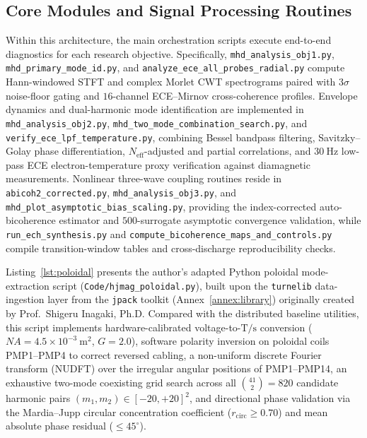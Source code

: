 \subsection{Core Modules and Signal Processing Routines}
\begin{sloppypar}
Within this architecture, the main orchestration scripts execute end-to-end diagnostics for each research objective. Specifically, \texttt{mhd\_\allowbreak analysis\_\allowbreak obj1.py}, \texttt{mhd\_\allowbreak primary\_\allowbreak mode\_\allowbreak id.py}, and \texttt{analyze\_\allowbreak ece\_\allowbreak all\_\allowbreak probes\_\allowbreak radial.py} compute Hann-windowed STFT and complex Morlet CWT spectrograms paired with $3\sigma$ noise-floor gating and $16$-channel ECE--Mirnov cross-coherence profiles. Envelope dynamics and dual-harmonic mode identification are implemented in \texttt{mhd\_\allowbreak analysis\_\allowbreak obj2.py}, \texttt{mhd\_\allowbreak two\_\allowbreak mode\_\allowbreak combination\_\allowbreak search.py}, and \texttt{verify\_\allowbreak ece\_\allowbreak lpf\_\allowbreak temperature.py}, combining Bessel bandpass filtering, Savitzky--Golay phase differentiation, $N_{\mathrm{eff}}$-adjusted and partial correlations, and $30~\mathrm{Hz}$ low-pass ECE electron-temperature proxy verification against diamagnetic measurements. Nonlinear three-wave coupling routines reside in \texttt{abicoh2\_\allowbreak corrected.py}, \texttt{mhd\_\allowbreak analysis\_\allowbreak obj3.py}, and \texttt{mhd\_\allowbreak plot\_\allowbreak asymptotic\_\allowbreak bias\_\allowbreak scaling.py}, providing the index-corrected auto-bicoherence estimator and $500$-surrogate asymptotic convergence validation, while \texttt{run\_\allowbreak ech\_\allowbreak synthesis.py} and \texttt{compute\_\allowbreak bicoherence\_\allowbreak maps\_\allowbreak and\_\allowbreak controls.py} compile transition-window tables and cross-discharge reproducibility checks.
\end{sloppypar}

\label{appendix:poloidalm}
Listing~\ref{lst:poloidal} presents the author's adapted Python poloidal mode-extraction script (\texttt{Code/\allowbreak hjmag\_\allowbreak poloidal.py}), built upon the \texttt{turnelib} data-ingestion layer from the \texttt{jpack} toolkit (Annex~\ref{annex:library}) originally created by Prof.\ Shigeru Inagaki, Ph.D. Compared with the distributed baseline utilities, this script implements hardware-calibrated voltage-to-$\mathrm{T}/\mathrm{s}$ conversion ($N A = 4.5 \times 10^{-3}~\mathrm{m^2}$, $G = 2.0$), software polarity inversion on poloidal coils PMP1--PMP4 to correct reversed cabling, a non-uniform discrete Fourier transform (NUDFT) over the irregular angular positions of PMP1--PMP14, an exhaustive two-mode coexisting grid search across all $\binom{41}{2} = 820$ candidate harmonic pairs $(m_1, m_2) \in [-20, +20]^2$, and directional phase validation via the Mardia--Jupp circular concentration coefficient ($r_{\mathrm{circ}} \ge 0.70$) and mean absolute phase residual ($\le 45^\circ$).

